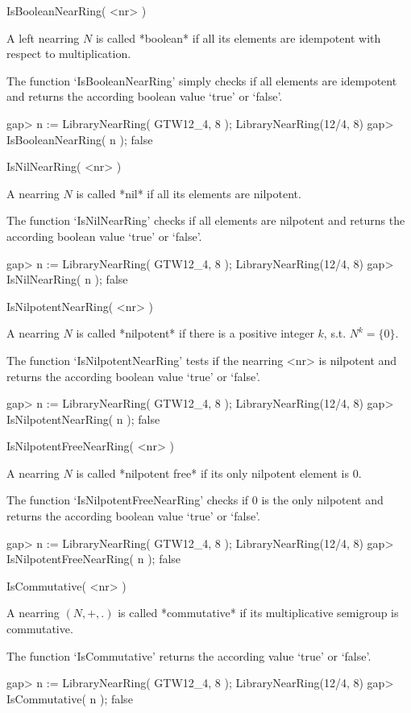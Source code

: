 \>IsBooleanNearRing( <nr> )

A left nearring $N$ is called *boolean* if all its elements are
idempotent with respect to multiplication.

The function `IsBooleanNearRing' simply checks if all elements
are idempotent and returns the according boolean value 
`true' or `false'.

\beginexample
    gap> n := LibraryNearRing( GTW12_4, 8 );            
    LibraryNearRing(12/4, 8)
    gap> IsBooleanNearRing( n );
    false
\endexample

\>IsNilNearRing( <nr> )

A nearring $N$ is called *nil* if all its elements are nilpotent.

The function `IsNilNearRing' checks if all elements are nilpotent and returns
the according boolean value `true' or `false'.

\beginexample
    gap> n := LibraryNearRing( GTW12_4, 8 );            
    LibraryNearRing(12/4, 8)
    gap> IsNilNearRing( n );
    false
\endexample

\>IsNilpotentNearRing( <nr> )

A nearring $N$ is called *nilpotent* if there is a positive integer
$k$, s.t. $N^k = \{0\}$.

The function `IsNilpotentNearRing' tests if
the nearring <nr> is nilpotent and returns the according boolean value 
`true' or `false'.

\beginexample
    gap> n := LibraryNearRing( GTW12_4, 8 );            
    LibraryNearRing(12/4, 8)
    gap> IsNilpotentNearRing( n );
    false
\endexample

\>IsNilpotentFreeNearRing( <nr> )

A nearring $N$ is called *nilpotent free* if its only nilpotent
element is $0$.

The function `IsNilpotentFreeNearRing' checks if 
$0$ is the only nilpotent and returns the according boolean value 
`true' or `false'.

\beginexample
    gap> n := LibraryNearRing( GTW12_4, 8 );            
    LibraryNearRing(12/4, 8)
    gap> IsNilpotentFreeNearRing( n );
    false
\endexample

\>IsCommutative( <nr> )

A nearring $(N,+,.)$ is called *commutative* if its multiplicative semigroup
is commutative.

The function `IsCommutative' returns the according value `true' or `false'.

\beginexample
    gap> n := LibraryNearRing( GTW12_4, 8 );            
    LibraryNearRing(12/4, 8)
    gap> IsCommutative( n );
    false
\endexample

